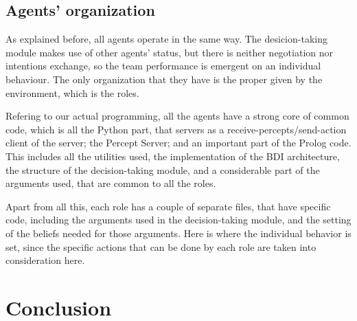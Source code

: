 \documentclass{llncs2e/llncs}
\begin{document}
\subsection{Agents' organization}

    As explained before, all agents operate in the same way. The desicion-taking
    module makes use of other agents' status, but there is neither negotiation nor 
    intentions exchange, so the team performance is emergent on an individual behaviour. 
    The only organization that they have is the proper given by the environment, 
    which is the roles.
    
    Refering to our actual programming, all the agents have a strong core of common
    code, which is all the Python part, that servers as a receive-percepts/send-action client 
    of the server; the Percept Server; and an important part of the Prolog code. This includes all the 
    utilities used, the implementation of the BDI architecture, the structure of the 
    decision-taking module, and a considerable part of the arguments used, that
    are common to all the roles.
        
    Apart from all this, each role has a couple of separate files, that have 
    specific code, including the arguments used in the decision-taking module, and
    the setting of the beliefs needed for those arguments. Here is where the 
    individual behavior is set, since the specific actions that can be done by each
    role are taken into consideration here.
    
    

\section{Conclusion}

\end{document}
